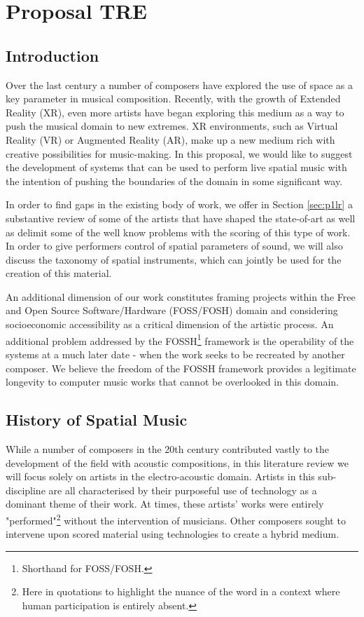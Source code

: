\chapter{Proposal TRE}

\section{Introduction}

Over the last century a number of composers have explored the use of space as a key parameter in musical composition. Recently, with the growth of Extended Reality (XR), even more artists have began exploring this medium as a way to push the musical domain to new extremes. XR environments, such as Virtual Reality (VR) or Augmented Reality (AR), make up a new medium rich with creative possibilities for music-making. In this proposal, we would like to suggest the development of systems that can be used to perform live spatial music with the intention of pushing the boundaries of the domain in some significant way. 

In order to find gaps in the existing body of work, we offer in Section \ref{sec:p1lr} a substantive review of some of the artists that have shaped the state-of-art as well as delimit some of the well know problems with the scoring of this type of work. In order to give performers control of spatial parameters of sound, we will also discuss the taxonomy of spatial instruments, which can jointly be used for the creation of this material. 

An additional dimension of our work constitutes framing projects within the Free and Open Source Software/Hardware (FOSS/FOSH) domain and considering socioeconomic accessibility as a critical dimension of the artistic process. An additional problem addressed by the FOSSH\footnote{Shorthand for FOSS/FOSH.} framework is the operability of the systems at a much later date - when the work seeks to be recreated by another composer. We believe the freedom of the FOSSH framework provides a legitimate longevity to computer music works that cannot be overlooked in this domain. 

\section{History of Spatial Music} 
While a number of composers in the 20th century contributed vastly to the development of the field with acoustic compositions, in this literature review we will focus solely on artists in the electro-acoustic domain. Artists in this sub-discipline are all characterised by their purposeful use of technology as a dominant theme of their work. At times, these artists' works were entirely "performed"\footnote{Here in quotations to highlight the nuance of the word in a context where human participation is entirely absent.} without the intervention of musicians. Other composers sought to intervene upon scored material using technologies to create a hybrid medium. 

